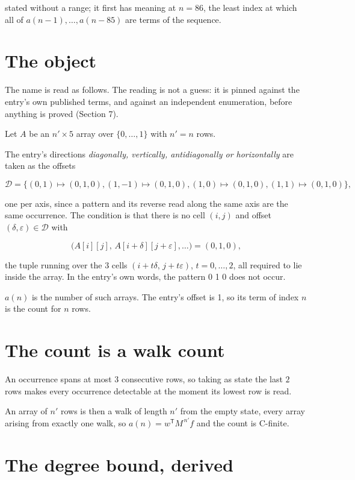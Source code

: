\documentclass[11pt]{article}
\theoremstyle{definition}
\begin{document}
stated without a range; it first has meaning at $n = 86$, the least index at which all of $a(n-1),\dots,a(n-85)$ are terms of the sequence.

\section{The object}

The name is read as follows. The reading is not a guess: it is pinned against the entry's own published terms, and against an independent enumeration, before anything is proved (Section 7).

Let $A$ be an $n' \times 5$ array over $\{0,\dots,1\}$ with $n' = n$ rows.

The entry's directions {\itshape diagonally, vertically, antidiagonally or horizontally} are taken as the offsets

\[\mathcal{D} = \{(0,1)\mapsto(0,1,0), (1,-1)\mapsto(0,1,0), (1,0)\mapsto(0,1,0), (1,1)\mapsto(0,1,0)\},\]

one per axis, since a pattern and its reverse read along the same axis are the same occurrence. The condition is that there is no cell $(i,j)$ and offset $(\delta,\varepsilon)\in\mathcal{D}$ with

\[\bigl(A[i][j],\,A[i{+}\delta][j{+}\varepsilon],\dots\bigr) = (0, 1, 0),\]

the tuple running over the $3$ cells $(i+t\delta,\,j+t\varepsilon)$, $t = 0,\dots,2$, all required to lie inside the array. In the entry's own words, the pattern 0 1 0 does not occur.

$a(n)$ is the number of such arrays. The entry's offset is 1, so its term of index $n$ is the count for $n$ rows.

\section{The count is a walk count}

An occurrence spans at most $3$ consecutive rows, so taking as state the last $2$ rows makes every occurrence detectable at the moment its lowest row is read.

An array of $n'$ rows is then a walk of length $n'$ from the empty state, every array arising from exactly one walk, so $a(n) = w^{\mathsf T}M^{\,n'}f$ and the count is C-finite.

\section{The degree bound, derived}
\end{document}
